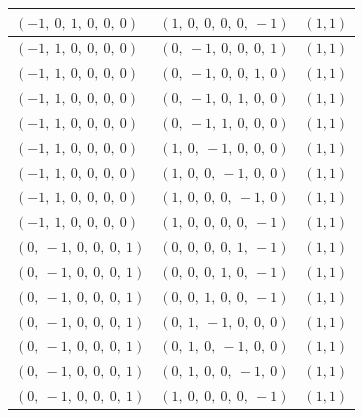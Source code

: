 \documentclass[11pt]{article}
\theoremstyle{definition}
\begin{document}
\begin{longtable}{|l|l|c|}
    \hline
    $\left( -1, \  0, \  1, \  0, \  0, \  0\right)$ & $\left( 1, \  0, \  0, \  0, \  0, \  -1\right)$ & $(1,1)$ \\
    \hline
    $\left( -1, \  1, \  0, \  0, \  0, \  0\right)$ & $\left( 0, \  -1, \  0, \  0, \  0, \  1\right)$ & $(1,1)$ \\
    \hline
    $\left( -1, \  1, \  0, \  0, \  0, \  0\right)$ & $\left( 0, \  -1, \  0, \  0, \  1, \  0\right)$ & $(1,1)$ \\
    \hline
    $\left( -1, \  1, \  0, \  0, \  0, \  0\right)$ & $\left( 0, \  -1, \  0, \  1, \  0, \  0\right)$ & $(1,1)$ \\
    \hline
    $\left( -1, \  1, \  0, \  0, \  0, \  0\right)$ & $\left( 0, \  -1, \  1, \  0, \  0, \  0\right)$ & $(1,1)$ \\
    \hline
    $\left( -1, \  1, \  0, \  0, \  0, \  0\right)$ & $\left( 1, \  0, \  -1, \  0, \  0, \  0\right)$ & $(1,1)$ \\
    \hline
    $\left( -1, \  1, \  0, \  0, \  0, \  0\right)$ & $\left( 1, \  0, \  0, \  -1, \  0, \  0\right)$ & $(1,1)$ \\
    \hline
    $\left( -1, \  1, \  0, \  0, \  0, \  0\right)$ & $\left( 1, \  0, \  0, \  0, \  -1, \  0\right)$ & $(1,1)$ \\
    \hline
    $\left( -1, \  1, \  0, \  0, \  0, \  0\right)$ & $\left( 1, \  0, \  0, \  0, \  0, \  -1\right)$ & $(1,1)$ \\
    \hline
    $\left( 0, \  -1, \  0, \  0, \  0, \  1\right)$ & $\left( 0, \  0, \  0, \  0, \  1, \  -1\right)$ & $(1,1)$ \\
    \hline
    $\left( 0, \  -1, \  0, \  0, \  0, \  1\right)$ & $\left( 0, \  0, \  0, \  1, \  0, \  -1\right)$ & $(1,1)$ \\
    \hline
    $\left( 0, \  -1, \  0, \  0, \  0, \  1\right)$ & $\left( 0, \  0, \  1, \  0, \  0, \  -1\right)$ & $(1,1)$ \\
    \hline
    $\left( 0, \  -1, \  0, \  0, \  0, \  1\right)$ & $\left( 0, \  1, \  -1, \  0, \  0, \  0\right)$ & $(1,1)$ \\
    \hline
    $\left( 0, \  -1, \  0, \  0, \  0, \  1\right)$ & $\left( 0, \  1, \  0, \  -1, \  0, \  0\right)$ & $(1,1)$ \\
    \hline
    $\left( 0, \  -1, \  0, \  0, \  0, \  1\right)$ & $\left( 0, \  1, \  0, \  0, \  -1, \  0\right)$ & $(1,1)$ \\
    \hline
    $\left( 0, \  -1, \  0, \  0, \  0, \  1\right)$ & $\left( 1, \  0, \  0, \  0, \  0, \  -1\right)$ & $(1,1)$ \\

\end{longtable}
\end{document}
